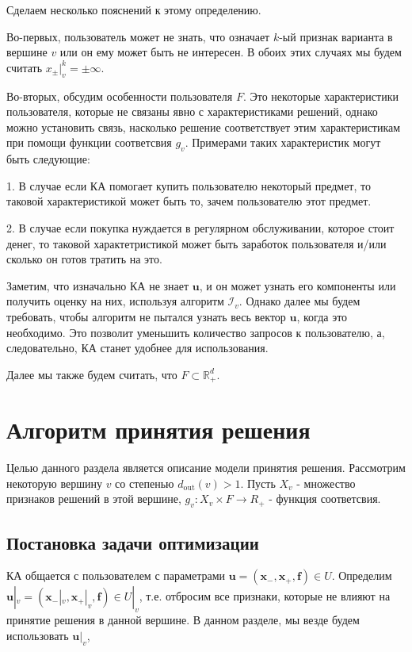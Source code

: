 \documentclass[12pt]{article}
\begin{document}
Сделаем несколько пояснений к этому определению.

Во-первых, пользователь может не знать, что означает $k$-ый признак варианта в вершине $v$ или он ему может быть не интересен. В обоих этих случаях мы будем считать $x_\pm|_v^k = \pm\infty$.

Во-вторых, обсудим особенности пользователя $F$. Это некоторые характеристики пользователя, которые не связаны явно с характеристиками решений, однако можно установить связь, насколько решение соответствует этим характеристикам при помощи функции соответсвия $g_v$. Примерами таких характеристик могут быть следующие:

1. В случае если КА помогает купить пользователю некоторый предмет, то таковой характеристикой может быть то, зачем пользователю этот предмет.

2. В случае если покупка нуждается в регулярном обслуживании, которое стоит денег, то таковой характетристикой может быть заработок пользователя и/или сколько он готов тратить на это. 

Заметим, что изначально КА не знает $\textbf{u}$, и он может узнать его компоненты или получить оценку на них, используя алгоритм $\mathcal{I}_v$. Однако далее мы будем требовать, чтобы алгоритм не пытался узнать весь вектор $\textbf{u}$, когда это необходимо. Это позволит уменьшить количество запросов к пользователю, а, следовательно, КА станет удобнее для использования.

Далее мы также будем считать, что $F \subset \mathbb{R}_+^d$.

\section{Алгоритм принятия решения}

Целью данного раздела является описание модели принятия решения. Рассмотрим некоторую вершину $v$ со степенью $d_\text{out}(v)>1$. Пусть $X_v$ - множество признаков решений в этой вершине, $g_v:X_v\times F \rightarrow R_+$ - функция соответсвия.

\subsection{Постановка задачи оптимизации}

КА общается с пользователем с параметрами $\textbf{u}=(\textbf{x}_-, \textbf{x}_+, \textbf{f}) \in U$. Определим $\textbf{u}|_v = (\textbf{x}_-|_v, \textbf{x}_+|_v, \textbf{f}) \in U|_v$, т.е. отбросим все признаки, которые не влияют на принятие решения в данной вершине. В данном разделе, мы везде будем использовать $\textbf{u}|_v$, 
\end{document}
